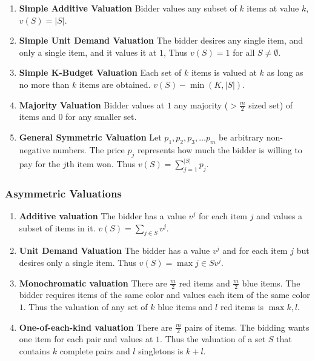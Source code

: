 \documentclass{article}
\begin{document}
\begin{enumerate}
    \item \textbf{Simple Additive Valuation}
    Bidder values any subset of \(k\) items at value \(k\), \(v(S) = |S|\).   
    \item \textbf{Simple Unit Demand Valuation}
    The bidder desires any single item, and only a single item, and it values it at \(1\), Thus \(v(S) = 1\) for all \(S \neq \emptyset\).   
    \item \textbf{Simple K-Budget Valuation}
    Each set of \(k\) items is valued at \(k\) as long as no more than \(k\) items are obtained. \(v(S) - \min(K, |S|)\).     
    \item \textbf{Majority Valuation}
    Bidder values at \(1\) any majority (\(> \frac{m}{2}\) sized set) of items and \(0\) for any smaller set.  
    \item \textbf{General Symmetric Valuation}
    Let \(p_1, p_2, p_3, \ldots p_m \) be arbitrary non-negative numbers. The price \(p_j\) represents how much the bidder is willing to pay for the \(j\)th item won. Thus \(v(S) = \sum_{j=1}^|S| p_j  \). 

\end{enumerate}

\subsubsection{Asymmetric Valuations}

\begin{enumerate}
    \item \textbf{Additive valuation}
    The bidder has a value \(v^j\) for each item \(j\) and values a subset of items in it. \(v(S) = \sum_{j\in S} v^j \).    
    \item \textbf{Unit Demand Valuation}
    The bidder has a value \(v^j\) and for each item \(j\) but desires only a single item. Thus \(v(S) = \max j\in S v^j\).   
    \item \textbf{Monochromatic valuation}
    There are \(\frac{m}{2}\) red items and \(\frac{m}{2}\) blue items. The bidder requires items of the same color and values each item of the same color \(1\). Thus the valuation of any set of \(k\) blue items and \(l\) red items is \(\max{k, l}\).       
    \item \textbf{One-of-each-kind valuation}
    There are \(\frac{m}{2}\) pairs of items. The bidding wants one item for each pair and values at \(1\). Thus the valuation of a set \(S\) that contains \(k\) complete pairs and \(l\) singletons is \(k+l\).       
\end{enumerate}
\end{document}
